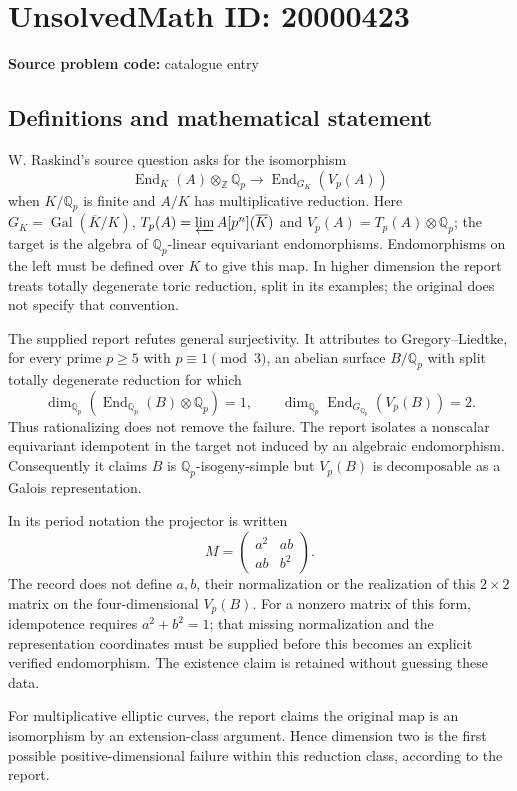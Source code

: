 \documentclass[11pt]{article}
\newcommand{\Z}{\mathbb{Z}}
\newcommand{\Q}{\mathbb{Q}}
\begin{document}
\section*{UnsolvedMath ID: 20000423}
\textbf{Source problem code:} catalogue entry
\subsection{Definitions and mathematical statement}
W. Raskind's source question asks for the isomorphism
\[
 \operatorname{End}_K(A)\otimes_{\Z}\Q_p\longrightarrow
 \operatorname{End}_{G_K}(V_p(A))
\]
when $K/\Q_p$ is finite and $A/K$ has multiplicative reduction. Here $G_K=\operatorname{Gal}(\overline K/K)$, $T_p(A)=\varprojlim A[p^n](\overline K)$ and $V_p(A)=T_p(A)\otimes\Q_p$; the target is the algebra of $\Q_p$-linear equivariant endomorphisms. Endomorphisms on the left must be defined over $K$ to give this map. In higher dimension the report treats totally degenerate toric reduction, split in its examples; the original does not specify that convention.

The supplied report refutes general surjectivity. It attributes to Gregory--Liedtke, for every prime $p\geq5$ with $p\equiv1\pmod3$, an abelian surface $B/\Q_p$ with split totally degenerate reduction for which
\[
 \dim_{\Q_p}(\operatorname{End}_{\Q_p}(B)\otimes\Q_p)=1,\qquad
 \dim_{\Q_p}\operatorname{End}_{G_{\Q_p}}(V_p(B))=2.
\]
Thus rationalizing does not remove the failure. The report isolates a nonscalar equivariant idempotent in the target not induced by an algebraic endomorphism. Consequently it claims $B$ is $\Q_p$-isogeny-simple but $V_p(B)$ is decomposable as a Galois representation.

In its period notation the projector is written
\[
 M=\begin{pmatrix}a^2&ab\\ab&b^2\end{pmatrix}.
\]
The record does not define $a,b$, their normalization or the realization of this $2\times2$ matrix on the four-dimensional $V_p(B)$. For a nonzero matrix of this form, idempotence requires $a^2+b^2=1$; that missing normalization and the representation coordinates must be supplied before this becomes an explicit verified endomorphism. The existence claim is retained without guessing these data.

For multiplicative elliptic curves, the report claims the original map is an isomorphism by an extension-class argument. Hence dimension two is the first possible positive-dimensional failure within this reduction class, according to the report.
\end{document}
